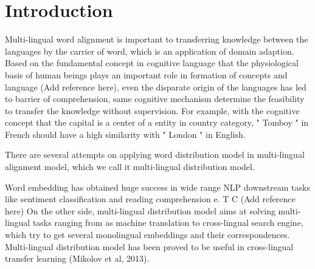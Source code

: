 \section{Introduction}

Multi-lingual word alignment is important to transferring knowledge between the languages 
	by the carrier of word, which is an application of domain adaption. 
Based on the fundamental concept in cognitive language 
	that the physiological basis of human beings 
	plays an important role in formation of concepts and language (Add reference here), 
	even the disparate origin of the languages has led to barrier of comprehension, 
	same cognitive mechanism determine the feasibility to transfer the knowledge without supervision. 
For example, 
	with the cognitive concept that the capital is a center of a entity in country category, 
	" Tomboy " in French should have a high similarity with " London " in English. 


There are several attempts on applying word distribution model in multi-lingual alignment model, 
	which we call it multi-lingual distribution model. 


Word embedding has obtained huge success in wide range NLP downstream tasks 
	like sentiment classification and reading comprehension e. T C (Add reference here) 
On the other side, 
	multi-lingual distribution model aims at solving multi-lingual tasks ranging 
	from as machine translation to cross-lingual search engine, 
	which try to get several monolingual embeddings and their correspondences. 
Multi-lingual distribution model has been proved to be useful 
	in cross-lingual transfer learning (Mikolov et al, 2013). 


